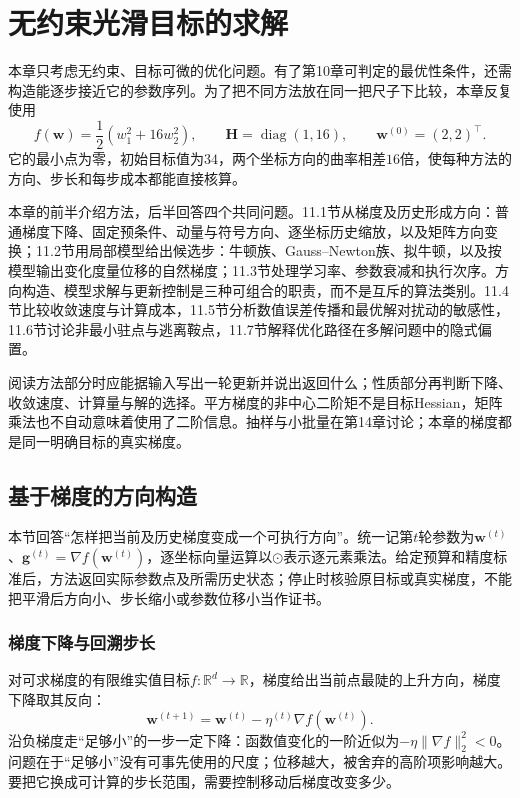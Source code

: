 \chapter{无约束光滑目标的求解}
\label{chap:smooth-optimization}

本章只考虑无约束、目标可微的优化问题。有了第10章可判定的最优性条件，还需构造能逐步接近它的参数序列。为了把不同方法放在同一把尺子下比较，本章反复使用
\begin{equation}
 f(\bm w)=\frac12(w_1^2+16w_2^2),\qquad
 \bm H=\operatorname{diag}(1,16),\qquad
 \bm w^{(0)}=(2,2)^\top.
 \label{eq:opt-common-quadratic}
\end{equation}
它的最小点为零，初始目标值为$34$，两个坐标方向的曲率相差$16$倍，使每种方法的方向、步长和每步成本都能直接核算。

本章的前半介绍方法，后半回答四个共同问题。11.1节从梯度及历史形成方向：普通梯度下降、固定预条件、动量与符号方向、逐坐标历史缩放，以及矩阵方向变换；11.2节用局部模型给出候选步：牛顿族、Gauss--Newton族、拟牛顿，以及按模型输出变化度量位移的自然梯度；11.3节处理学习率、参数衰减和执行次序。方向构造、模型求解与更新控制是三种可组合的职责，而不是互斥的算法类别。11.4节比较收敛速度与计算成本，11.5节分析数值误差传播和最优解对扰动的敏感性，11.6节讨论非最小驻点与逃离鞍点，11.7节解释优化路径在多解问题中的隐式偏置。

阅读方法部分时应能据输入写出一轮更新并说出返回什么；性质部分再判断下降、收敛速度、计算量与解的选择。平方梯度的非中心二阶矩不是目标Hessian，矩阵乘法也不自动意味着使用了二阶信息。抽样与小批量在第14章讨论；本章的梯度都是同一明确目标的真实梯度。

\section{基于梯度的方向构造}
\label{sec:opt-first-order-methods}

本节回答“怎样把当前及历史梯度变成一个可执行方向”。统一记第$t$轮参数为$\bm w^{(t)}$、$\bm g^{(t)}=\nabla f(\bm w^{(t)})$，逐坐标向量运算以$\odot$表示逐元素乘法。给定预算和精度标准后，方法返回实际参数点及所需历史状态；停止时核验原目标或真实梯度，不能把平滑后方向小、步长缩小或参数位移小当作证书。

\subsection{梯度下降与回溯步长}
\label{sec:opt-gradient-descent}

对可求梯度的有限维实值目标$f:\mathbb R^d\to\mathbb R$，梯度给出当前点最陡的上升方向，梯度下降取其反向：
\begin{equation}
  \bm{w}^{(t+1)}=\bm{w}^{(t)}-\eta^{(t)}\nabla f(\bm{w}^{(t)}).
  \label{eq:opt-gradient-descent}
\end{equation}
沿负梯度走“足够小”的一步一定下降：函数值变化的一阶近似为$-\eta\|\nabla f\|_2^2<0$。问题在于“足够小”没有可事先使用的尺度；位移越大，被舍弃的高阶项影响越大。要把它换成可计算的步长范围，需要控制移动后梯度改变多少。

